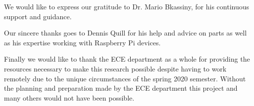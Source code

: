 \begin{center}
\vspace{0.25\textheight}
\par We would like to express our gratitude to Dr. Mario Bkassiny, for his continuous support and guidance.  \\ 
\vspace{1em}
\par Our sincere thanks goes to Dennis Quill for his help and advice on parts as well as his expertise working with Raspberry Pi devices. \\ 
\vspace{1em}
\par Finally we would like to thank the ECE department as a whole for providing the resources necessary to make this research possible despite having to work remotely due to the unique circumstances of the spring 2020 semester. Without the planning and preparation made by the ECE department this project and many others would not have been possible. 
\end{center}